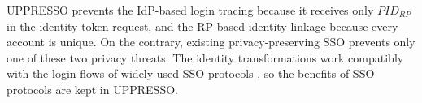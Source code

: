 UPPRESSO prevents the IdP-based login tracing because it receives only $PID_{RP}$ in the identity-token request,
    and the RP-based identity linkage because every account is unique.
On the contrary,
     existing privacy-preserving SSO \cite{BrowserID,SPRESSO,NIST2017draft} prevents only one of these two privacy threats.
The identity transformations work compatibly with
    the login flows of widely-used SSO protocols \cite{OpenIDConnect,rfc6749,SAML,NIST2017draft},
    so the benefits of SSO protocols are kept in UPPRESSO.
%
%

